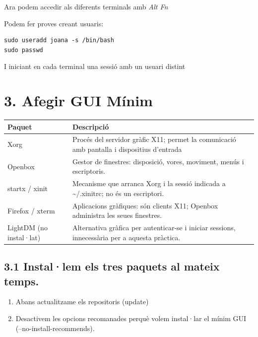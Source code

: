 \documentclass[
  catalan,
  a4paper,
]{article}
\providecommand{\tightlist}{%
  \setlength{\itemsep}{0pt}\setlength{\parskip}{0pt}}
\begin{document}
Ara podem accedir als diferents terminals amb \emph{Alt Fn}

Podem fer proves creant usuaris:

\begin{verbatim}
sudo useradd joana -s /bin/bash
sudo passwd
\end{verbatim}

I iniciant en cada terminal una sessió amb un usuari distint

\section{3. Afegir GUI Mínim}\label{afegir-gui-muxednim}

\begin{longtable}[]{@{}
  >{\raggedright\arraybackslash}p{}
  >{\raggedright\arraybackslash}p{}@{}}
\toprule\noalign{}
\begin{minipage}[b]{\linewidth}\raggedright
Paquet
\end{minipage} & \begin{minipage}[b]{\linewidth}\raggedright
Descripció
\end{minipage} \\
\midrule\noalign{}
\endhead
\bottomrule\noalign{}
\endlastfoot
Xorg & Procés del servidor gràfic X11; permet la comunicació amb
pantalla i dispositius d'entrada \\
Openbox & Gestor de finestres: disposició, vores, moviment, menús i
escriptoris. \\
startx / xinit & Mecanisme que arranca Xorg i la sessió indicada a
\textasciitilde/.xinitrc; no és un escriptori. \\
Firefox / xterm & Aplicacions gràfiques: són clients X11; Openbox
administra les seues finestres. \\
LightDM (no instal·lat) & Alternativa gràfica per autenticar-se i
iniciar sessions, innecessària per a aquesta pràctica. \\
\end{longtable}

\subsection{3.1 Instal·lem els tres paquets al mateix
temps.}\label{installem-els-tres-paquets-al-mateix-temps.}

\begin{enumerate}
\def\labelenumi{\arabic{enumi}.}
\tightlist
\item
  Abans actualitzame els repositoris (update)
\item
  Desactivem les opcions recomanades perquè volem instal·lar el mínim
  GUI (--no-install-recommends).
\end{enumerate}
\end{document}
